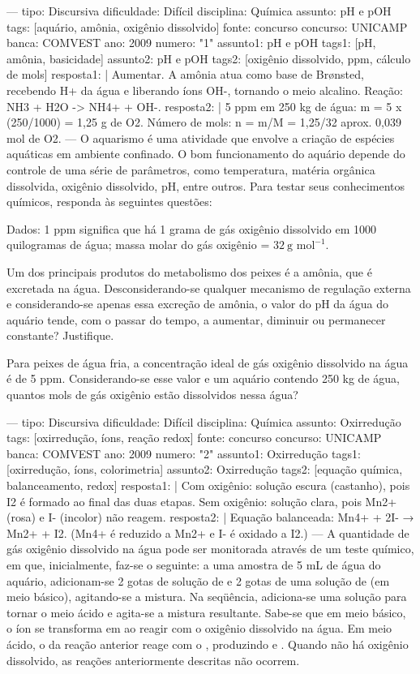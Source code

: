 \setquestion
---
tipo: Discursiva
dificuldade: Difícil
disciplina: Química
assunto: pH e pOH
tags: [aquário, amônia, oxigênio dissolvido]
fonte: concurso
concurso: UNICAMP
banca: COMVEST
ano: 2009
numero: "1"
assunto1: pH e pOH
tags1: [pH, amônia, basicidade]
assunto2: pH e pOH
tags2: [oxigênio dissolvido, ppm, cálculo de mols]
resposta1: |
  Aumentar. A amônia atua como base de Brønsted, recebendo H+ da água e liberando íons OH-,
  tornando o meio alcalino. Reação: NH3 + H2O -> NH4+ + OH-.
resposta2: |
  5 ppm em 250 kg de água: m = 5 x (250/1000) = 1,25 g de O2.
  Número de mols: n = m/M = 1,25/32 aprox. 0,039 mol de O2.
---
O aquarismo é uma atividade que envolve a criação de espécies aquáticas em ambiente confinado. O bom funcionamento do aquário depende do controle de uma série de parâmetros, como temperatura, matéria orgânica dissolvida, oxigênio dissolvido, pH, entre outros. Para testar seus conhecimentos químicos, responda às seguintes questões:

Dados: 1 ppm significa que há 1 grama de gás oxigênio dissolvido em 1000 quilogramas de água; massa molar do gás oxigênio = \(32\ \text{g mol}^{-1}\).

\questionitem
Um dos principais produtos do metabolismo dos peixes é a amônia, que é excretada na água. Desconsiderando-se qualquer mecanismo de regulação externa e considerando-se apenas essa excreção de amônia, o valor do pH da água do aquário tende, com o passar do tempo, a aumentar, diminuir ou permanecer constante? Justifique.

\questionitem
Para peixes de água fria, a concentração ideal de gás oxigênio dissolvido na água é de 5 ppm. Considerando-se esse valor e um aquário contendo 250 kg de água, quantos mols de gás oxigênio estão dissolvidos nessa água?

\setquestion
---
tipo: Discursiva
dificuldade: Difícil
disciplina: Química
assunto: Oxirredução
tags: [oxirredução, íons, reação redox]
fonte: concurso
concurso: UNICAMP
banca: COMVEST
ano: 2009
numero: "2"
assunto1: Oxirredução
tags1: [oxirredução, íons, colorimetria]
assunto2: Oxirredução
tags2: [equação química, balanceamento, redox]
resposta1: |
  Com oxigênio: solução escura (castanho), pois I2 é formado ao final das duas etapas.
  Sem oxigênio: solução clara, pois Mn2+ (rosa) e I- (incolor) não reagem.
resposta2: |
  Equação balanceada: Mn4+ + 2I- → Mn2+ + I2.
  (Mn4+ é reduzido a Mn2+ e I- é oxidado a I2.)
---
A quantidade de gás oxigênio dissolvido na água pode ser monitorada através de um teste químico, em que, inicialmente, faz-se o seguinte: a uma amostra de 5 mL de água do aquário, adicionam-se 2 gotas de solução de  e 2 gotas de uma solução de  (em meio básico), agitando-se a mistura. Na seqüência, adiciona-se uma solução para tornar o meio ácido e agita-se a mistura resultante. Sabe-se que em meio básico, o íon  se transforma em  ao reagir com o oxigênio dissolvido na água. Em meio ácido, o  da reação anterior reage com o , produzindo  e . Quando não há oxigênio dissolvido, as reações anteriormente descritas não ocorrem.

